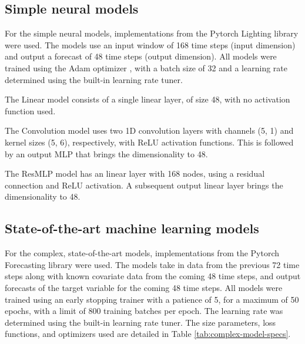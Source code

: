 \begin{subappendices}
    \subsection{Simple neural models}

    For the simple neural models, implementations from the Pytorch Lighting library \citep{falcon2019PyTorchLightning} were used. The models use an input window of 168 time steps (input dimension) and output a forecast of 48 time steps (output dimension). All models were trained using the Adam optimizer \citep{kingma2017AdamMethodStochastic}, with a batch size of 32 and a learning rate determined using the built-in learning rate tuner.

    The Linear model consists of a single linear layer, of size 48, with no activation function used.

    The Convolution model uses two 1D convolution layers with channels (5, 1) and kernel sizes (5, 6), respectively, with ReLU activation functions. This is followed by an output MLP that brings the dimensionality to 48.

    The ResMLP model has an linear layer with 168 nodes, using a residual connection and ReLU activation. A subsequent output linear layer brings the dimensionality to 48.

    \subsection{State-of-the-art machine learning models}

    For the complex, state-of-the-art models, implementations from the Pytorch Forecasting library \citep{beitner2024Jdb78Pytorchforecasting} were used. The models take in data from the previous 72 time steps along with known covariate data from the coming 48 time steps, and output forecasts of the target variable for the coming 48 time steps. All models were trained using an early stopping trainer with a patience of 5, for a maximum of 50 epochs, with a limit of 800 training batches per epoch. The learning rate was determined using the built-in learning rate tuner. The size parameters, loss functions, and optimizers used are detailed in Table \ref{tab:complex-model-specs}.


\end{subappendices}
